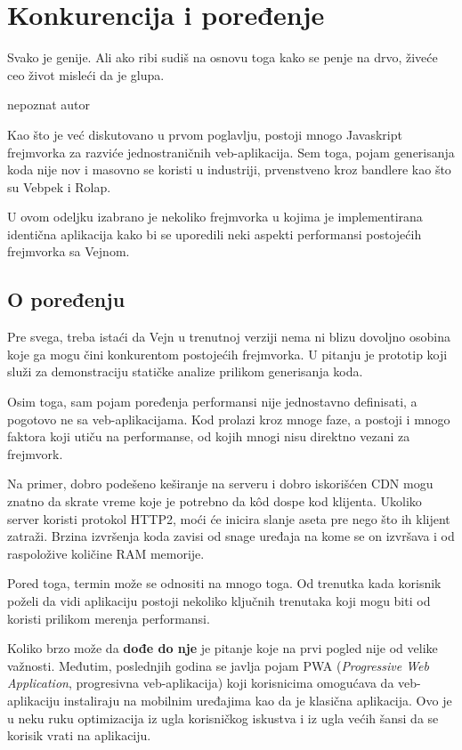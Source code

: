 \chapter{Konkurencija i poređenje}

\epigraph{
  Svako je genije. Ali ako ribi sudiš na osnovu toga kako se penje na drvo, živeće ceo život misleći da je glupa.
}{nepoznat autor}

Kao što je već diskutovano u prvom poglavlju, postoji mnogo Javaskript frejmvorka za razviće jednostraničnih veb-aplikacija.
Sem toga, pojam generisanja koda nije nov i masovno se koristi u industriji, prvenstveno kroz bandlere kao što su Vebpek i Rolap.

U ovom odeljku izabrano je nekoliko frejmvorka u kojima je implementirana identična  aplikacija kako bi se uporedili neki aspekti performansi postojećih frejmvorka sa Vejnom.

\section{O poređenju}

Pre svega, treba istaći da Vejn u trenutnoj verziji nema ni blizu dovoljno osobina koje ga mogu čini konkurentom postojećih frejmvorka.
U pitanju je prototip koji služi za demonstraciju statičke analize prilikom generisanja koda.

Osim toga, sam pojam poređenja performansi nije jednostavno definisati, a pogotovo ne sa veb-aplikacijama.
Kod prolazi kroz mnoge faze, a postoji i mnogo faktora koji utiču na performanse, od kojih mnogi nisu direktno vezani za frejmvork.

Na primer, dobro podešeno keširanje na serveru i dobro iskorišćen CDN mogu znatno da skrate vreme koje je potrebno da kôd dospe kod klijenta.
Ukoliko server koristi protokol HTTP2, moći će inicira slanje aseta pre nego što ih klijent zatraži.
Brzina izvršenja koda zavisi od snage uređaja na kome se on izvršava i od raspoložive količine RAM memorije.

Pored toga, termin  može se odnositi na mnogo toga.
Od trenutka kada korisnik poželi da vidi aplikaciju postoji nekoliko ključnih trenutaka koji mogu biti od koristi prilikom merenja performansi.

Koliko brzo može da \textbf{dođe do nje} je pitanje koje na prvi pogled nije od velike važnosti.
Međutim, poslednjih godina se javlja pojam PWA (\textsl{Progressive Web Application}, progresivna veb-aplikacija) koji korisnicima omogućava da veb-aplikaciju instaliraju na mobilnim uređajima kao da je klasična aplikacija.
Ovo je u neku ruku optimizacija iz ugla korisničkog iskustva i iz ugla većih šansi da se korisik vrati na aplikaciju.

